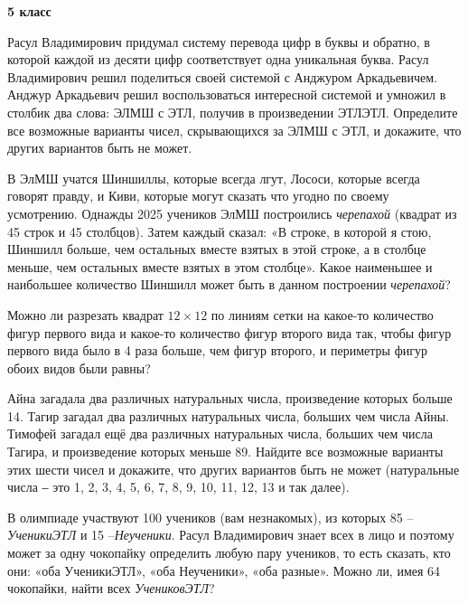 \raggedright{\hspace{3mm}

\centerline{\bf \Huge 5 класс}

Расул Владимирович придумал систему перевода цифр в буквы и обратно, в которой каждой из десяти цифр соответствует одна уникальная буква. Расул Владимирович решил поделиться своей системой с Анджуром Аркадьевичем. Анджур Аркадьевич решил воспользоваться интересной системой и умножил в столбик два слова: ЭЛМШ с ЭТЛ, получив в произведении ЭТЛЭТЛ. Определите все возможные варианты чисел, скрывающихся за ЭЛМШ с ЭТЛ, и докажите, что других вариантов быть не может.

В ЭлМШ учатся Шиншиллы, которые всегда лгут, Лососи, которые всегда говорят правду, и Киви, которые могут сказать что угодно по своему усмотрению. Однажды 2025 учеников ЭлМШ построились \textit{черепахой} (квадрат из 45 строк и 45 столбцов). Затем каждый сказал: «В строке, в которой я стою, Шиншилл больше, чем остальных вместе взятых в этой строке, а в столбце меньше, чем остальных вместе взятых в этом столбце». Какое наименьшее и наибольшее количество Шиншилл может быть в данном построении \textit{черепахой}?

Можно ли разрезать квадрат $12\times12$ по линиям сетки на какое-то количество фигур первого вида и какое-то количество фигур второго вида так, чтобы фигур первого вида было в 4 раза больше, чем фигур второго, и периметры фигур обоих видов были равны?

Айна загадала два различных натуральных числа, произведение которых больше 14. Тагир загадал два различных натуральных числа, больших чем числа Айны. Тимофей загадал ещё два различных натуральных числа, больших чем числа Тагира, и произведение которых меньше 89. Найдите все возможные варианты этих шести чисел и докажите, что других вариантов быть не может (натуральные числа ‒ это 1, 2, 3, 4, 5, 6, 7, 8, 9, 10, 11, 12, 13 и так далее).

В олимпиаде участвуют 100 учеников (вам незнакомых), из которых 85 – \textit{УченикиЭТЛ} и 15 –\textit{Неученики}. Расул Владимирович знает всех в лицо и поэтому может за одну чокопайку определить любую пару учеников, то есть сказать, кто они: «оба УченикиЭТЛ», «оба Неученики», «оба разные». Можно ли, имея 64 чокопайки, найти всех \textit{УчениковЭТЛ}?}


